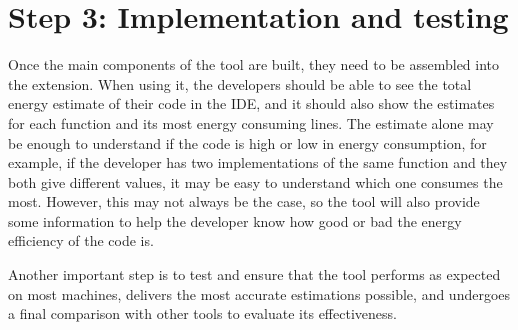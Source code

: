 \section{Step 3: Implementation and testing} \label{sec:work_step3_implementation_and_testing}

Once the main components of the tool are built, they need to be assembled into the extension. When using it, the developers should be able to see the total energy estimate of their code in the IDE, and it should also show the estimates for each function and its most energy consuming lines.
The estimate alone may be enough to understand if the code is high or low in energy consumption, for example, if the developer has two implementations of the same function and they both give different values, it may be easy to understand which one consumes the most. However, this may not always be the case, so the tool will also provide some information to help the developer know how good or bad the energy efficiency of the code is.

Another important step is to test and ensure that the tool performs as expected on most machines, delivers the most accurate estimations possible, and undergoes a final comparison with other tools to evaluate its effectiveness.
